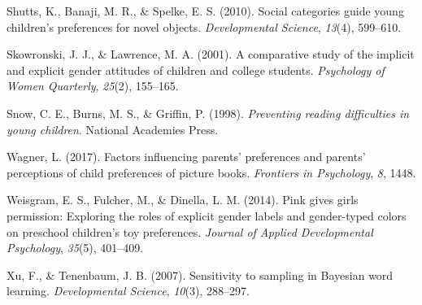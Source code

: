 \documentclass[
  english,
  ,man,floatsintext]{apa6}
\begin{document}
\leavevmode\hypertarget{ref-shutts2010social}{}%
Shutts, K., Banaji, M. R., \& Spelke, E. S. (2010). Social categories guide young children's preferences for novel objects. \emph{Developmental Science}, \emph{13}(4), 599--610.

\leavevmode\hypertarget{ref-skowronski2001comparative}{}%
Skowronski, J. J., \& Lawrence, M. A. (2001). A comparative study of the implicit and explicit gender attitudes of children and college students. \emph{Psychology of Women Quarterly}, \emph{25}(2), 155--165.

\leavevmode\hypertarget{ref-snow1998preventing}{}%
Snow, C. E., Burns, M. S., \& Griffin, P. (1998). \emph{Preventing reading difficulties in young children}. National Academies Press.

\leavevmode\hypertarget{ref-wagner2017factors}{}%
Wagner, L. (2017). Factors influencing parents' preferences and parents' perceptions of child preferences of picture books. \emph{Frontiers in Psychology}, \emph{8}, 1448.

\leavevmode\hypertarget{ref-weisgram2014pink}{}%
Weisgram, E. S., Fulcher, M., \& Dinella, L. M. (2014). Pink gives girls permission: Exploring the roles of explicit gender labels and gender-typed colors on preschool children's toy preferences. \emph{Journal of Applied Developmental Psychology}, \emph{35}(5), 401--409.

\leavevmode\hypertarget{ref-xu2007b}{}%
Xu, F., \& Tenenbaum, J. B. (2007). Sensitivity to sampling in Bayesian word learning. \emph{Developmental Science}, \emph{10}(3), 288--297.
\end{document}
